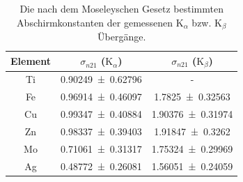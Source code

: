 \documentclass[
	a4paper,
	12pt,
	pagesize,
	ngerman
]{scrartcl}
\begin{document}
	\begin{table}[H]
		\centering
		\begin{tabular}{ c | c | c}
			Element & $\sigma_{n21}$ ($\text{K}_\alpha$) &  $\sigma_{n21}$ ($\text{K}_\beta$)\\ \hline \hline
			Ti & \SI{0,90249+-0,62796}{} & - \\
			Fe & \SI{0,96914+-0,46097}{} & \SI{1,7825+-0,32563}{} \\
			Cu & \SI{0,99347+-0,40884}{} & \SI{1,90376+-0,31974}{} \\
			Zn & \SI{0.98337+-0.39403}{} & \SI{1.91847+-0.3262}{} \\
			Mo & \SI{0,71061+-0,31317}{} & \SI{1,75324+-0,29969}{} \\
			Ag & \SI{0,48772+-0,26081}{} & \SI{1,56051+-0,24059}{} \\		
		\end{tabular}
	\caption{Die nach dem Moseleyschen Gesetz bestimmten Abschirmkonstanten der gemessenen $\text{K}_\alpha$ bzw. $\text{K}_\beta$ Übergänge.}
	\label{tb_abschirm} 
	\end{table}	
\end{document}
